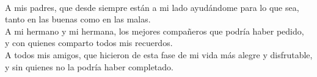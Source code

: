 \huge
\scshape\color{AzulFI_dark}
\\

\normalsize\normalfont\normalcolor

\itshape

\noindent
A mis padres, que desde siempre están a mi lado ayudándome para lo que sea,\\
tanto en las buenas como en las malas.\\

\noindent
A mi hermano y mi hermana, los mejores compañeros que podría haber pedido,\\
y con quienes comparto todos mis recuerdos.\\

\noindent
A todos mis amigos, que hicieron de esta fase de mi vida más alegre y disfrutable,\\
y sin quienes no la podría haber completado.\\